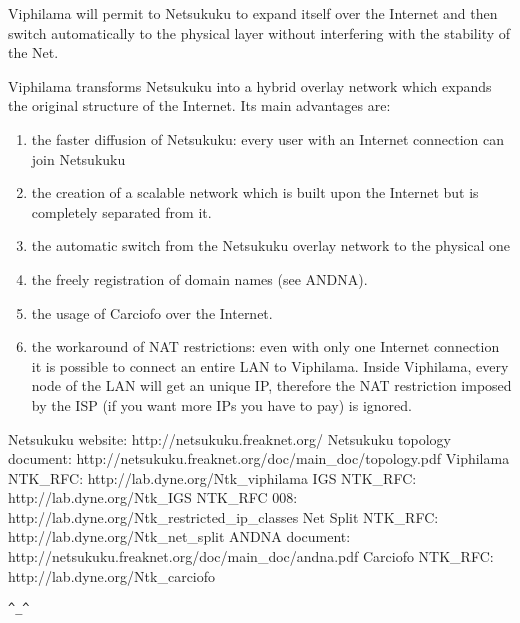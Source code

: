 \documentclass[a4paper]{article}
\newcommand{\href}[2]{ #1 }
\begin{document}
Viphilama  will permit to Netsukuku to expand itself over the Internet and then
switch automatically to the physical layer without interfering with the
stability of the Net.

Viphilama transforms Netsukuku into a hybrid overlay network which expands the
original structure of the Internet. Its main advantages are:

\begin{enumerate}
	\item the faster diffusion of Netsukuku: every user with an Internet
		connection can join Netsukuku

	\item the creation of a scalable network which is built upon the Internet
		but is completely separated from it.

	\item the automatic switch from the Netsukuku overlay network to the physical one

	\item the freely registration of domain names (see ANDNA\cite{ANDNA}).

	\item the usage of Carciofo \cite{carciofo} over the Internet.

	\item the workaround of NAT restrictions: even with only one Internet
		connection it is possible to connect an entire LAN to Viphilama. 
		Inside Viphilama, every node of the LAN will get an unique IP,
		therefore the NAT restriction imposed by the ISP (if you want more
		IPs you have to pay) is ignored.
\end{enumerate}




\begin{thebibliography}{99}
	 Netsukuku website:
		\href{http://netsukuku.freaknet.org/}{http://netsukuku.freaknet.org/}
	 Netsukuku topology document:
		\href{http://netsukuku.freaknet.org/doc/main\_doc/topology.pdf}{topology.pdf}
	 Viphilama NTK\_RFC:
		\href{http://lab.dyne.org/Ntk\_viphilama}{Viphilama}
	 IGS NTK\_RFC:
		\href{http://lab.dyne.org/Ntk\_IGS}{IGS}
	 NTK\_RFC 008:
		\href{http://lab.dyne.org/Ntk\_restricted\_ip\_classes}{Restricted ip classes}
	 Net Split NTK\_RFC:
		\href{http://lab.dyne.org/Ntk\_net\_split}{Net split}
	 ANDNA document:
		\href{http://netsukuku.freaknet.org/doc/main\_doc/andna.pdf}{andna.pdf}
	 Carciofo NTK\_RFC:
		\href{http://lab.dyne.org/Ntk\_carciofo}{Carciofo}
\end{thebibliography}
\newpage

\begin{center}
\verb|^_^|
\end{center}
\end{document}
